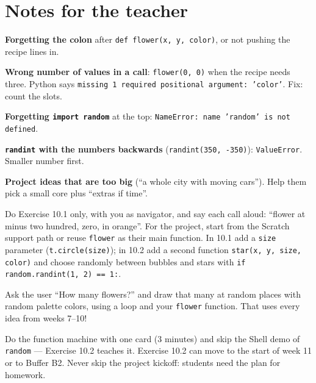 \section{Notes for the teacher}
\begin{commonmistakes}
  \item \textbf{Forgetting the colon} after \texttt{def flower(x, y, color)}, or not pushing the recipe lines in.
  \item \textbf{Wrong number of values in a call}: \texttt{flower(0, 0)} when the recipe needs three. Python says \texttt{missing 1 required positional argument: 'color'}. Fix: count the slots.
  \item \textbf{Forgetting \texttt{import random}} at the top: \texttt{NameError: name 'random' is not defined}.
  \item \textbf{\texttt{randint} with the numbers backwards} (\texttt{randint(350, -350)}): \texttt{ValueError}. Smaller number first.
  \item \textbf{Project ideas that are too big} (\enquote{a whole city with moving cars}). Help them pick a small core plus \enquote{extras if time}.
\end{commonmistakes}
\begin{differentiation}
\supportpath Do Exercise 10.1 only, with you as navigator, and say each call aloud: \enquote{flower at minus two hundred, zero, in orange}. For the project, start from the Scratch support path or reuse \texttt{flower} as their main function.
\extensionpath In 10.1 add a \texttt{size} parameter (\texttt{t.circle(size)}); in 10.2 add a second function \texttt{star(x, y, size, color)} and choose randomly between bubbles and stars with \texttt{if random.randint(1, 2) == 1:}.
\end{differentiation}
\begin{stretchchallenge}
Ask the user \enquote{How many flowers?} and draw that many at random places with random palette colors, using a loop and your \texttt{flower} function. That uses every idea from weeks 7--10!
\end{stretchchallenge}
\begin{teachernote}
Do the function machine with one card (3 minutes) and skip the Shell demo of \texttt{random} --- Exercise 10.2 teaches it. Exercise 10.2 can move to the start of week 11 or to Buffer B2. Never skip the project kickoff: students need the plan for homework.
\end{teachernote}
